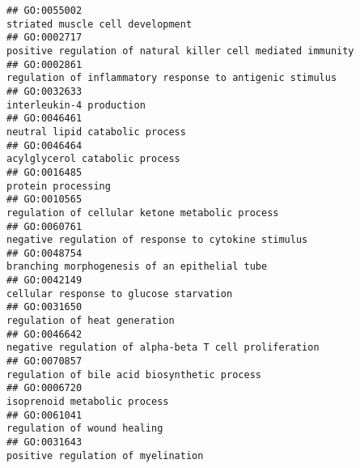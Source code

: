 \documentclass[
]{article}
\begin{document}
\begin{verbatim}
## GO:0055002                                                                                                                 striated muscle cell development
## GO:0002717                                                                                     positive regulation of natural killer cell mediated immunity
## GO:0002861                                                                                        regulation of inflammatory response to antigenic stimulus
## GO:0032633                                                                                                                         interleukin-4 production
## GO:0046461                                                                                                                  neutral lipid catabolic process
## GO:0046464                                                                                                                   acylglycerol catabolic process
## GO:0016485                                                                                                                               protein processing
## GO:0010565                                                                                                  regulation of cellular ketone metabolic process
## GO:0060761                                                                                             negative regulation of response to cytokine stimulus
## GO:0048754                                                                                                    branching morphogenesis of an epithelial tube
## GO:0042149                                                                                                          cellular response to glucose starvation
## GO:0031650                                                                                                                    regulation of heat generation
## GO:0046642                                                                                           negative regulation of alpha-beta T cell proliferation
## GO:0070857                                                                                                     regulation of bile acid biosynthetic process
## GO:0006720                                                                                                                     isoprenoid metabolic process
## GO:0061041                                                                                                                      regulation of wound healing
## GO:0031643                                                                                                               positive regulation of myelination

\end{verbatim}
\end{document}

